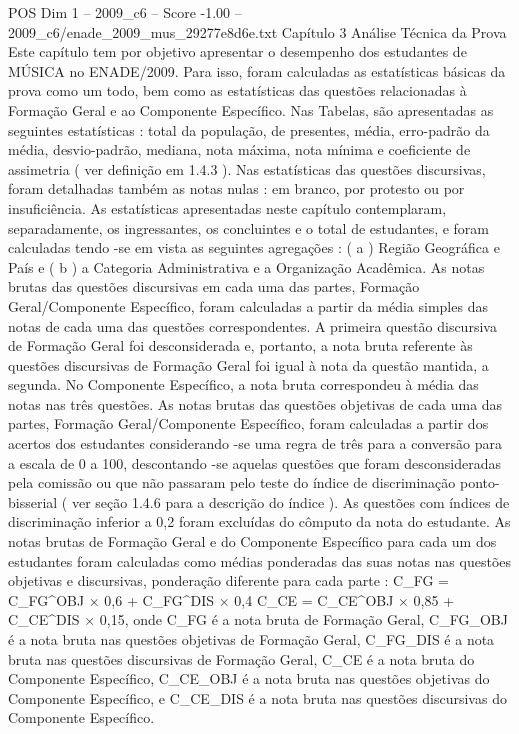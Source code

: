 \begin{textsample}{POS Dim 1 – 2009\_c6 – Score -1.00 – 2009\_c6/enade\_2009\_mus\_29277e8d6e.txt}  \label{ex:f1_pos_221}
Capítulo 3 Análise Técnica da Prova Este capítulo tem por objetivo apresentar o desempenho dos estudantes de MÚSICA no ENADE/2009.
Para isso, foram calculadas as estatísticas básicas da prova como um todo, bem como as estatísticas das questões relacionadas à Formação Geral e ao Componente Específico.
Nas Tabelas, são apresentadas as seguintes estatísticas : total da população, de presentes, média, erro-padrão da média, desvio-padrão, mediana, nota máxima, nota mínima e coeficiente de assimetria ( ver definição em 1.4.3 ).
Nas estatísticas das questões discursivas, foram detalhadas também as notas nulas : em branco, por protesto ou por insuficiência.
As estatísticas apresentadas neste capítulo contemplaram, separadamente, os ingressantes, os concluintes e o total de estudantes, e foram calculadas tendo -se em vista as seguintes agregações : ( a ) Região Geográfica e País e ( b ) a Categoria Administrativa e a Organização Acadêmica.
As notas brutas das questões discursivas em cada uma das partes, Formação Geral/Componente Específico, foram calculadas a partir da média simples das notas de cada uma das questões correspondentes.
A primeira questão discursiva de Formação Geral foi desconsiderada e, portanto, a nota bruta referente às questões discursivas de Formação Geral foi igual à nota da questão mantida, a segunda.
No Componente Específico, a nota bruta correspondeu à média das notas nas três questões.
As notas brutas das questões objetivas de cada uma das partes, Formação Geral/Componente Específico, foram calculadas a partir dos acertos dos estudantes considerando -se uma regra de três para a conversão para a escala de 0 a 100, descontando -se aquelas questões que foram desconsideradas pela comissão ou que não passaram pelo teste do índice de discriminação ponto-bisserial ( ver seção 1.4.6 para a descrição do índice ).
As questões com índices de discriminação inferior a 0,2 foram excluídas do cômputo da nota do estudante.
As notas brutas de Formação Geral e do Componente Específico para cada um dos estudantes foram calculadas como médias ponderadas das suas notas nas questões objetivas e discursivas, ponderação diferente para cada parte : C\_FG = C\_FG\textasciicircum{}OBJ × 0,6 + C\_FG\textasciicircum{}DIS × 0,4 C\_CE = C\_CE\textasciicircum{}OBJ × 0,85 + C\_CE\textasciicircum{}DIS × 0,15, onde C\_FG é a nota bruta de Formação Geral, C\_FG\_OBJ é a nota bruta nas questões objetivas de Formação Geral, C\_FG\_DIS é a nota bruta nas questões discursivas de Formação Geral, C\_CE é a nota bruta do Componente Específico, C\_CE\_OBJ é a nota bruta nas questões objetivas do Componente Específico, e C\_CE\_DIS é a nota bruta nas questões discursivas do Componente Específico.

\end{textsample}

